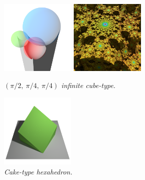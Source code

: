\begin{figure}[htbp]
\begin{minipage}[t]{0.5\textwidth}
 \begin{minipage}[t]{0.24\textwidth}
  \centering
  \includegraphics[width=1.4in, height=1.4in, keepaspectratio]
  {./img/application/sphairahedron/variations/cube/prismType5.png}
 \end{minipage}
 \hspace*{\fill}
 \begin{minipage}[t]{0.24\textwidth}
  \centering
  \includegraphics[width=1.4in, height=1.4in, keepaspectratio]
  {./img/application/sphairahedron/variations/cube/limitType5.jpg}
 \end{minipage}
 \hspace*{\fill}
 \caption{\textit{$(\pi/2,~\pi/4,~\pi/4)$ infinite cube-type.}}
 \label{fig:cube-244}
\end{minipage}
 \begin{minipage}[t]{0.5\textwidth}
  \centering
  \includegraphics[width=1.4in, height=1.4in, keepaspectratio]
  {./img/application/sphairahedron/variations/hexahedralCake2/base.png}
  \caption{\textit{Cake-type hexahedron.}}
  \label{fig:cake-polyhedron}
 \end{minipage}
 \hspace*{\fill}
\end{figure}

